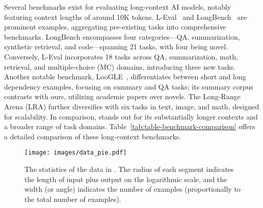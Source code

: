 Several benchmarks exist for evaluating long-context AI models, notably featuring context lengths of around 10K tokens. L-Eval~\citep{An2023LEvalIS} and LongBench~\citep{bai2023longbench} are prominent examples, aggregating pre-existing tasks\cite{Kocisk2017TheNR,Dasigi2021ADO,Yang2018HotpotQAAD,Huang2021EfficientAF,Joshi2017TriviaQAAL} into comprehensive benchmarks. LongBench encompasses four categories—QA, summarization, synthetic retrieval, and code—spanning 21 tasks, with four being novel. Conversely, L-Eval incorporates 18 tasks across QA, summarization, math, retrieval, and multiple-choice (MC) domains, introducing three new tasks. Another notable benchmark, LooGLE~\citep{Li2023LooGLECL}, differentiates between short and long dependency examples, focusing on summary and QA tasks; its summary corpus contrasts with ours, utilizing academic papers over novels. The Long-Range Arena (LRA) \citep{tay2020long} further diversifies with six tasks in text, image, and math, designed for scalability. In comparison, \OURSSPACE stands out for its substantially longer contexts and a broader range of task domains. Table~\ref{tab:table-benchmark-comparison} offers a detailed comparison of these long-context benchmarks.

\begin{figure}[!t]
    \centering
    \texttt{[image: images/data\_pie.pdf]}
    \caption{The statistics of the data in \OURS. The radius of each segment indicates the length of input plus output on the logarithmic scale, and the width (or angle) indicates the number of examples (proportionally to the total number of examples).}
    \label{fig:data-distribution}
\end{figure}

\section{\OURS} %

